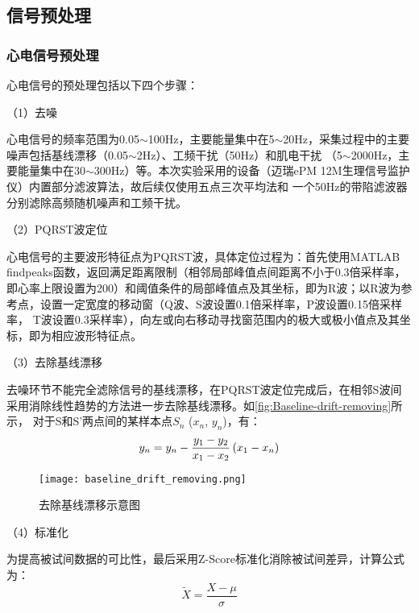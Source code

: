\subsection{信号预处理}
\subsubsection{心电信号预处理}
心电信号的预处理包括以下四个步骤：

（1）去噪

心电信号的频率范围为0.05$ \sim $100Hz，主要能量集中在5$ \sim $20Hz，采集过程中的主要噪声包括基线漂移（0.05$ \sim $2Hz）、工频干扰（50Hz）和肌电干扰
（5$ \sim $2000Hz，主要能量集中在30$ \sim $300Hz）等。本次实验采用的设备（迈瑞ePM 12M生理信号监护仪）内置部分滤波算法，故后续仅使用五点三次平均法和
一个50Hz的带陷滤波器分别滤除高频随机噪声和工频干扰。

（2）PQRST波定位

心电信号的主要波形特征点为PQRST波，具体定位过程为：首先使用MATLAB findpeaks函数，返回满足距离限制（相邻局部峰值点间距离不小于0.3倍采样率，
即心率上限设置为200）和阈值条件的局部峰值点及其坐标，即为R波；以R波为参考点，设置一定宽度的移动窗（Q波、S波设置0.1倍采样率，P波设置0.15倍采样率，
T波设置0.3采样率），向左或向右移动寻找窗范围内的极大或极小值点及其坐标，即为相应波形特征点。

（3）去除基线漂移

去噪环节不能完全滤除信号的基线漂移，在PQRST波定位完成后，在相邻S波间采用消除线性趋势的方法进一步去除基线漂移。如\autoref{fig:Baseline-drift-removing}所示，
对于S和S'两点间的某样本点$S_n$ ($x_n$, $y_n$)，有：
\vspace{1ex}
\begin{equation}
    \label{equ:Mean}
    y_{n}=y_{n}-\displaystyle{{\frac{y_{1}-y_{2}}{x_{1}-x_{2}}}}\left(x_{1}-x_{n}\right)
    \vspace{-7ex}
\end{equation}
\begin{figure}[htbp]
    \centering
    \texttt{[image: baseline\_drift\_removing.png]}
    \caption[去除基线漂移示意图]{去除基线漂移示意图}
    \label{fig:Baseline-drift-removing}
\end{figure}

（4）标准化

为提高被试间数据的可比性，最后采用Z-Score标准化消除被试间差异，计算公式为：
\vspace{-2ex}
\begin{equation}
    \label{equ:Mean}
    \tilde{X}=\frac{X-\mu}{\sigma}
\end{equation}

